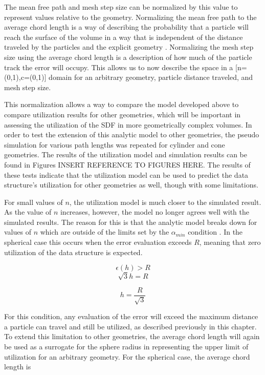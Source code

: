 The mean free path and mesh step size can be normalized by this value to
represent values relative to the geometry. Normalizing the mean free path to the
average chord length is a way of describing the probability that a particle will
reach the surface of the volume in a way that is independent of the distance
traveled by the particles and the explicit geometry \cite{Mazzolo_2014}. Normalizing the mesh step
size using the average chord length is a description of how much of the particle
track the error will occupy. This allows us to now describe the space in a
[n=(0,1),c=(0,1)] domain for an arbitrary geometry, particle distance traveled,
and mesh step size.

This normalization allows a way to compare the model developed above to compare
utilization results for other geometries, which will be important in assessing
the utilization of the SDF in more geometrically complex volumes. In order to
test the extension of this analytic model to other geometries, the pseudo
simulation for various path lengths was repeated for cylinder and cone
geometries. The results of the utilization model and simulation results can be
found in Figures INSERT REFERENCE TO FIGURES HERE. The results of these tests
indicate that the utilization model can be used to predict the data structure's
utilization for other geometries as well, though with some limitations.

For small values of $n$, the utilization model is much closer to the simulated
result. As the value of $n$ increases, however, the model no longer agrees well
with the simulated results. The reason for this is that the analytic model
breaks down for values of $n$ which are outside of the limits set by the
$\alpha_{min}$ condition . In the spherical case this occurs when the error
evaluation exceeds $R$, meaning that zero utilization of the data structure is
expected. 

$$ \epsilon(h) > R $$
$$  \sqrt{3}h = R $$

\begin{equation}
 h = \frac{R}{\sqrt{3}}
\label{eq:error_condition_sphere}
\end{equation}

For this condition, any evaluation of the error will exceed the maximum distance a
particle can travel and still be utilized, as described previously in this
chapter. To extend this limitation to other geometries, the average chord length
will again be used as a surrogate for the sphere radius in representing the upper
limit of utilization for an arbitrary geometry. For the spherical case, the
average chord length is 


